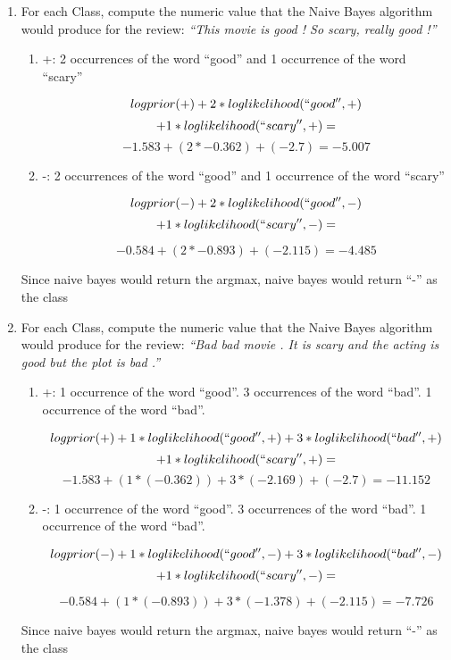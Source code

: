 \documentclass[11pt]{article}
\begin{document}
\begin{enumerate}
\begin{enumerate}
\item For each Class, compute the numeric value that the Naive Bayes algorithm would
  produce for the review: {\it ``This movie is good ! So scary, really good !''}
  

  \begin{enumerate}
  \item +: 2 occurrences of the word ``good'' and 1 occurrence of the word ``scary''
  
  $$logprior(+) + 2*loglikelihood(``good'', +)$$
  $$ + 1 * loglikelihood(``scary'', +) =$$
  $$ -1.583 + (2 * -0.362) + (-2.7) = -5.007$$
  
  \item -: 2 occurrences of the word ``good'' and 1 occurrence of the word ``scary''
  
  $$logprior(-) + 2*loglikelihood(``good'', -) $$
  $$+ 1 * loglikelihood(``scary'', -) =$$
  
  $$ -0.584 + (2 * -0.893) + (-2.115) = -4.485$$
  \end{enumerate}
  
  Since naive bayes would return the argmax, naive bayes would return ``-'' as the class

 \item For each Class, compute the numeric value that the Naive Bayes algorithm would
  produce for the review: {\it ``Bad bad movie . It is scary and the
    acting is good but the plot is bad .''}
    
  \begin{enumerate}
  \item +: 1 occurrence of the word ``good''. 3 occurrences of the word ``bad''. 1 occurrence of the word ``bad''.
  
    $$logprior(+) + 1*loglikelihood(``good'', +) + 3 * loglikelihood(``bad'', +) $$
    $$+ 1 * loglikelihood(``scary'', +) =$$
    $$ -1.583 + (1 * (-0.362)) + 3 * (-2.169) + (-2.7) = -11.152$$
  
  \item -: 1 occurrence of the word ``good''. 3 occurrences of the word ``bad''. 1 occurrence of the word ``bad''.
  
    $$logprior(-) + 1*loglikelihood(``good'', -) + 3 * loglikelihood(``bad'', -) $$
    $$+ 1 * loglikelihood(``scary'', -) =$$
    
    $$ -0.584 + (1 * (-0.893)) + 3 * (-1.378) + (-2.115) = -7.726$$
  \end{enumerate}

  Since naive bayes would return the argmax, naive bayes would return ``-'' as the class


\end{enumerate}


\end{enumerate}
\end{document}
